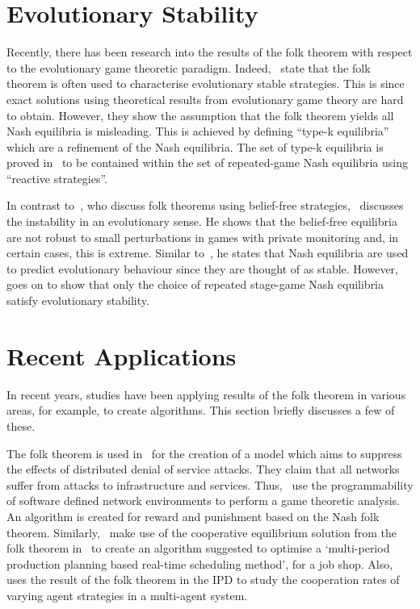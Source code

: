 \section{Evolutionary Stability}\label{sec:Evolutionary_Stability}
Recently, there has been research into the results of the folk theorem with
respect to the evolutionary game theoretic paradigm. Indeed,~\cite{Li2015} state
that the folk theorem is often used to characterise evolutionary stable
strategies. This is since exact solutions using theoretical results from
evolutionary game theory are hard to obtain. However, they show the
assumption that the folk theorem yields all Nash equilibria is misleading. This
is achieved by defining ``type-k equilibria'' which are a refinement of the Nash
equilibria. The set of type-k equilibria is proved
in~\cite{Li2015} to be contained
within the set of repeated-game Nash equilibria using ``reactive strategies''.

In contrast to~\cite{Ely2005,Yamamoto2009,
Yamamoto2012}, who discuss folk theorems using belief-free
strategies,~\cite{Heller2017} discusses the instability in an evolutionary
sense. He shows that the belief-free equilibria are not robust to small
perturbations in games with private monitoring and, in certain cases, this is
extreme. Similar to~\cite{Li2015}, he states that Nash equilibria are used to
predict evolutionary behaviour since they are thought of as stable.
However,~\cite{Heller2017} goes on to show that only the choice of repeated stage-game Nash equilibria satisfy evolutionary stability.  


\section{Recent Applications}\label{sec:Recent_Applications}
In recent years, studies have been applying results of the folk theorem in
various areas, for example, to create algorithms. This section briefly
discusses a few of these.

The folk theorem is used in~\cite{Chowdhary2017} for the creation of a model
which aims to suppress the effects of distributed denial of service attacks.
They claim that all networks suffer from attacks to infrastructure and services. Thus,~\cite{Chowdhary2017}
use the programmability of software defined network environments to perform a
game theoretic analysis. An algorithm is created for reward and
punishment based on the Nash folk theorem. Similarly,~\cite{Wang2020} make use
of the cooperative equilibrium solution from the folk theorem
in~\cite{Friedman1971} to create an algorithm suggested to optimise a
`multi-period production planning based real-time scheduling method', for a job
shop. Also,~\cite{Wang2018} uses the result of the folk theorem in the IPD to
study the cooperation rates of varying agent strategies in a multi-agent system.

